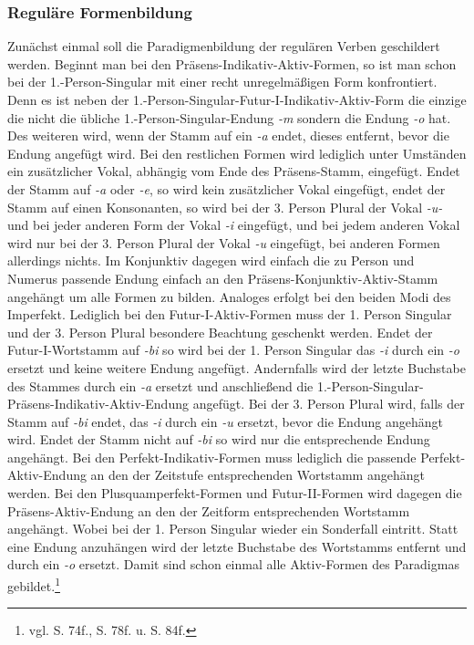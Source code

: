 \subsubsection{Reguläre Formenbildung}
Zunächst einmal soll die Paradigmenbildung der regulären Verben geschildert werden. Beginnt man bei den Präsens-Indikativ-Aktiv-Formen, so ist man schon bei der 1.-Person-Singular mit einer recht unregelmäßigen Form konfrontiert. Denn es ist neben der 1.-Person-Singular-Futur-I-Indikativ-Aktiv-Form die einzige die nicht die übliche 1.-Person-Singular-Endung \textit{-m} sondern die Endung \textit{-o} hat. Des weiteren wird, wenn der Stamm auf ein \textit{-a} endet, dieses entfernt, bevor die Endung angefügt wird. Bei den restlichen Formen wird lediglich unter Umständen ein zusätzlicher Vokal, abhängig vom Ende des Präsens-Stamm, eingefügt. Endet der Stamm auf \textit{-a} oder \textit{-e}, so wird kein zusätzlicher Vokal eingefügt, endet der Stamm auf einen Konsonanten, so wird bei der 3. Person Plural der Vokal \textit{-u-} und bei jeder anderen Form der Vokal \textit{-i} eingefügt, und bei jedem anderen Vokal wird nur bei der 3. Person Plural der Vokal \textit{-u} eingefügt, bei anderen Formen allerdings nichts. Im Konjunktiv dagegen wird einfach die zu Person und Numerus passende Endung einfach an den Präsens-Konjunktiv-Aktiv-Stamm angehängt um alle Formen zu bilden. Analoges erfolgt bei den beiden Modi des Imperfekt. Lediglich bei den Futur-I-Aktiv-Formen muss der 1. Person Singular und der 3. Person Plural besondere Beachtung geschenkt werden. Endet der Futur-I-Wortstamm auf \textit{-bi} so wird bei der 1. Person Singular das \textit{-i} durch ein \textit{-o} ersetzt und keine weitere Endung angefügt. Andernfalls wird der letzte Buchstabe des Stammes durch ein \textit{-a} ersetzt und anschließend die 1.-Person-Singular-Präsens-Indikativ-Aktiv-Endung angefügt. Bei der 3. Person Plural wird, falls der Stamm auf \textit{-bi} endet, das \textit{-i} durch ein \textit{-u} ersetzt, bevor die Endung angehängt wird. Endet der Stamm nicht auf \textit{-bi} so wird nur die entsprechende Endung angehängt. Bei den Perfekt-Indikativ-Formen muss lediglich die passende Perfekt-Aktiv-Endung an den der Zeitstufe entsprechenden Wortstamm angehängt werden. Bei den Plusquamperfekt-Formen und Futur-II-Formen wird dagegen die Präsens-Aktiv-Endung an den der Zeitform entsprechenden Wortstamm angehängt. Wobei bei der 1. Person Singular wieder ein Sonderfall eintritt. Statt eine Endung anzuhängen wird der letzte Buchstabe des Wortstamms entfernt und durch ein \textit{-o} ersetzt. Damit sind schon einmal alle Aktiv-Formen des Paradigmas gebildet.\footnote{vgl. \cite{BAYER-LINDAUER1994} S. 74f., S. 78f. u. S. 84f.} \par
